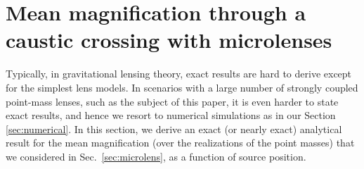 \documentclass{aastex6}
\newcommand{\refsec}[1]{Sec.~\ref{sec:#1}}
\begin{document}
\appendix


\section{Mean magnification through a caustic crossing with microlenses}
\label{app:analytics}

Typically, in gravitational lensing theory, exact results are hard to derive except 
for the simplest lens models. In scenarios with a large number of strongly coupled 
point-mass lenses, such as the subject of this paper, it is even harder to state
exact results, and hence we resort to numerical simulations as in our Section 
\ref{sec:numerical}. In this section, we derive an exact (or nearly exact) 
analytical result for the mean magnification (over the 
realizations of the point masses) that we considered in \refsec{microlens},
as a function of source position.
\end{document}
